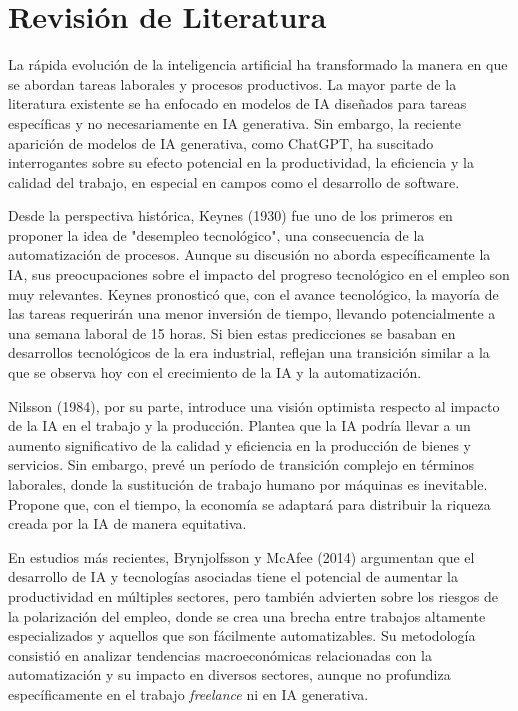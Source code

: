 \documentclass[twocolumn]{article}
\begin{document}
\section*{Revisión de Literatura}
La rápida evolución de la inteligencia artificial ha transformado la manera en que se abordan tareas laborales y procesos productivos. La mayor parte de la literatura existente se ha enfocado en modelos de IA diseñados para tareas específicas y no necesariamente en IA generativa. Sin embargo, la reciente aparición de modelos de IA generativa, como ChatGPT, ha suscitado interrogantes sobre su efecto potencial en la productividad, la eficiencia y la calidad del trabajo, en especial en campos como el desarrollo de software.

Desde la perspectiva histórica, Keynes (1930) fue uno de los primeros en proponer la idea de "desempleo tecnológico", una consecuencia de la automatización de procesos. Aunque su discusión no aborda específicamente la IA, sus preocupaciones sobre el impacto del progreso tecnológico en el empleo son muy relevantes. Keynes pronosticó que, con el avance tecnológico, la mayoría de las tareas requerirán una menor inversión de tiempo, llevando potencialmente a una semana laboral de 15 horas. Si bien estas predicciones se basaban en desarrollos tecnológicos de la era industrial, reflejan una transición similar a la que se observa hoy con el crecimiento de la IA y la automatización.

Nilsson (1984), por su parte, introduce una visión optimista respecto al impacto de la IA en el trabajo y la producción. Plantea que la IA podría llevar a un aumento significativo de la calidad y eficiencia en la producción de bienes y servicios. Sin embargo, prevé un período de transición complejo en términos laborales, donde la sustitución de trabajo humano por máquinas es inevitable. Propone que, con el tiempo, la economía se adaptará para distribuir la riqueza creada por la IA de manera equitativa.

En estudios más recientes, Brynjolfsson y McAfee (2014) argumentan que el desarrollo de IA y tecnologías asociadas tiene el potencial de aumentar la productividad en múltiples sectores, pero también advierten sobre los riesgos de la polarización del empleo, donde se crea una brecha entre trabajos altamente especializados y aquellos que son fácilmente automatizables. Su metodología consistió en analizar tendencias macroeconómicas relacionadas con la automatización y su impacto en diversos sectores, aunque no profundiza específicamente en el trabajo \emph{freelance} ni en IA generativa.
\end{document}
